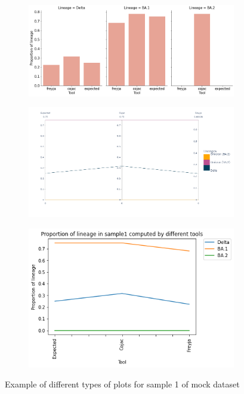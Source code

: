         \begin{figure}[H]
        	\centering
        	\begin{subfigure}[b]{0.7\textwidth}
            \includegraphics[width=1\textwidth]{figures/further/bar-s1.png}
            \label{fig:further:bar-s1}
        \end{subfigure}
        \begin{subfigure}[b]{0.7\textwidth}
        	\centering
            \includegraphics[width=1\textwidth]{figures/further/pc-s1.png}
            \label{fig:further:pc-s1}
        \end{subfigure}
        \begin{subfigure}[b]{0.7\textwidth}
        	\centering
            \includegraphics[width=1\textwidth]{figures/further/line-s1.png}
            \label{fig:further:line-s1}
            \end{subfigure}
        \caption{Example of different types of plots for sample 1 of mock dataset}
        \end{figure}
